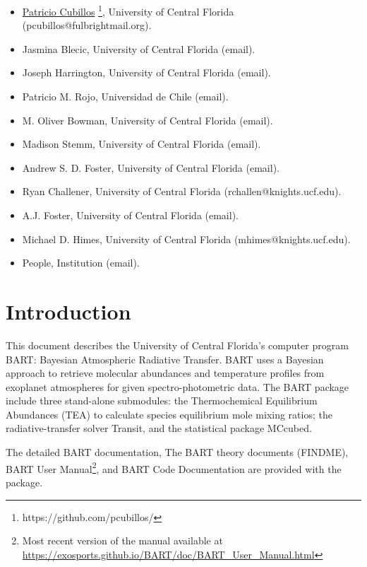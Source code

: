\documentclass[letterpaper, 12pt]{article}
\begin{document}
\begin{itemize}
\item \href{https://github.com/pcubillos/}{Patricio Cubillos}%
  \footnote{https://github.com/pcubillos/}, University of
  Central Florida (pcubillos@fulbrightmail.org).
\item Jasmina Blecic, University of Central Florida (email).
\item Joseph Harrington, University of Central Florida (email).
\item Patricio M. Rojo, Universidad de Chile (email).
\item M. Oliver Bowman, University of Central Florida (email).
\item Madison Stemm, University of Central Florida (email).
\item Andrew S. D. Foster, University of Central Florida (email).
\item Ryan Challener, University of Central Florida (rchallen@knights.ucf.edu).
\item A.J. Foster, University of Central Florida (email).
\item Michael D. Himes, University of Central Florida (mhimes@knights.ucf.edu).
\item People, Institution (email).
\end{itemize}

\section{Introduction}
\label{sec:theory}

This document describes the University of Central Florida's computer
program BART: Bayesian Atmospheric Radiative Transfer.  BART uses a
Bayesian approach to retrieve molecular abundances and temperature
profiles from exoplanet atmospheres for given spectro-photometric
data.  The BART package include three stand-alone submodules: the
Thermochemical Equilibrium Abundances (TEA) to calculate species
equilibrium mole mixing ratios; the radiative-transfer solver Transit,
and the statistical package MCcubed.


The detailed BART documentation, The BART theory documents (FINDME),
BART User Manual\footnote{Most recent version of the manual available at 
\href{https://exosports.github.io/BART/doc/BART_User_Manual.html}{https://exosports.github.io/BART/doc/BART\_User\_Manual.html}}, 
and BART Code Documentation are provided with the
package.
\end{document}
